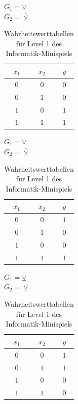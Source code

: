 \begin{table}[h!]
    \centering
    \begin{minipage}{.33\textwidth}
        $G_1 = \veebar$\\
        $G_2 = \overline{\veebar}$
        \vfill
        \begin{tabular}{|c|c|c|} 
            \hline
            $x_1$ & $x_2$ & $y$ \\
            \hline\hline
            $0$ & $0$ & $0$ \\
            $0$ & $1$ & $0$ \\
            $1$ & $0$ & $1$ \\
            $1$ & $1$ & $1$ \\
            \hline
        \end{tabular}
    \end{minipage}
    \hfill
    \begin{minipage}{.32\textwidth}
        $G_1 = \veebar$\\
        $G_2 = \overline{\veebar}$
        \vfill
        \begin{tabular}{|c|c|c|} 
            \hline
            $x_1$ & $x_2$ & $y$ \\
            \hline\hline
            $0$ & $0$ & $1$ \\
            $0$ & $1$ & $0$ \\
            $1$ & $0$ & $0$ \\
            $1$ & $1$ & $1$ \\
            \hline
        \end{tabular}
    \end{minipage}
    \hfill
    \begin{minipage}{.33\textwidth}
        $G_1 = \veebar$\\
        $G_2 = \overline{\veebar}$
        \vfill
        \begin{tabular}{|c|c|c|} 
            \hline
            $x_1$ & $x_2$ & $y$ \\
            \hline\hline
            $0$ & $0$ & $1$ \\
            $0$ & $1$ & $1$ \\
            $1$ & $0$ & $0$ \\
            $1$ & $1$ & $0$ \\
            \hline
        \end{tabular}
    \end{minipage}
    \caption{Wahrheitswerttabellen für Level 1 des Informatik-Minispiels}
    \label{tab:wahrheitswerttabellen02}
\end{table}

